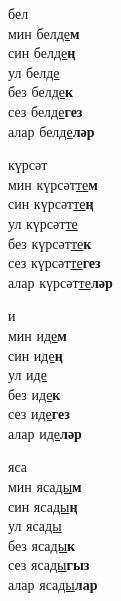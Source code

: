 \begin{multicols}{4}
\begin{enumerate}
\begin{minipage}{\linewidth}
    \item
    бел\\
    мин бел\underline{де}\textbf{м}\\
    син бел\underline{де}\textbf{ң}\\
    ул бел\underline{де}\\
    без бел\underline{де}\textbf{к}\\
    сез бел\underline{де}\textbf{гез}\\
    алар бел\underline{де}\textbf{ләр}\\
\end{minipage}

\begin{minipage}{\linewidth}
    \item
    күрсәт\\
    мин күрсәт\underline{те}\textbf{м}\\
    син күрсәт\underline{те}\textbf{ң}\\
    ул күрсәт\underline{те}\\
    без күрсәт\underline{те}\textbf{к}\\
    сез күрсәт\underline{те}\textbf{гез}\\
    алар күрсәт\underline{те}\textbf{ләр}\\
\end{minipage}

\begin{minipage}{\linewidth}
    \item
    и\\
    мин и\underline{де}\textbf{м}\\
    син и\underline{де}\textbf{ң}\\
    ул и\underline{де}\\
    без и\underline{де}\textbf{к}\\
    сез и\underline{де}\textbf{гез}\\
    алар и\underline{де}\textbf{ләр}\\
\end{minipage}

\begin{minipage}{\linewidth}
    \item
    яса\\
    мин яса\underline{ды}\textbf{м}\\
    син яса\underline{ды}\textbf{ң}\\
    ул яса\underline{ды}\\
    без яса\underline{ды}\textbf{к}\\
    сез яса\underline{ды}\textbf{гыз}\\
    алар яса\underline{ды}\textbf{лар}\\
\end{minipage}


\end{enumerate}
\end{multicols}
